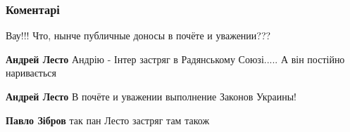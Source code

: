  
 
 
 
 
\subsubsection{Коментарі}

\begin{itemize}


Вау!!! Что, нынче публичные доносы в почёте и уважении???

\begin{itemize}

 
\textbf{Андрей Лесто} Андрію - Інтер застряг в Радянському Союзі.....
А він постійно наривається

 
\textbf{Андрей Лесто} В почёте и уважении выполнение Законов Украины!

 
\textbf{Павло Зібров} так пан Лесто застряг там також

 

\end{itemize}
\end{itemize}

